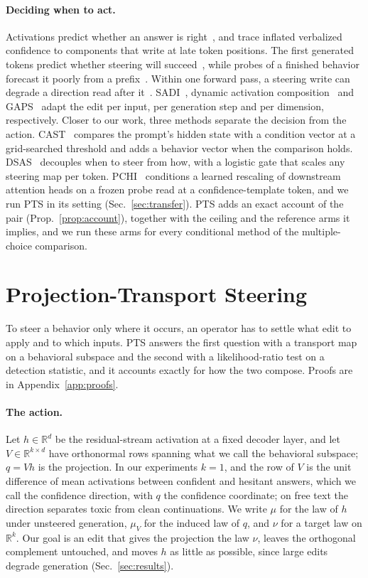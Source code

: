 \documentclass{article}
\begin{document}
\paragraph{Deciding when to act.} Activations predict whether an answer is
right~\citep{kadavath2022know,azaria2023lying}, and \citet{zhao2026wired} trace
inflated verbalized confidence to components that write at late token
positions. The first generated tokens predict whether steering will
succeed~\citep{steerable2026}, while probes of a finished behavior forecast it
poorly from a prefix~\citep{fpcg2026}. Within one forward pass, a steering
write can degrade a direction read after it~\citep{luo2026yopo}.
SADI~\citep{wang2025sadi}, dynamic activation
composition~\citep{scalena2024dynamic} and GAPS~\citep{gaps2026} adapt the edit
per input, per generation step and per dimension, respectively. Closer to our
work, three methods separate the decision from the action.
CAST~\citep{lee2024cast} compares the prompt's hidden state with a condition
vector at a grid-searched threshold and adds a behavior vector when the
comparison holds. DSAS~\citep{ferrando2026dsas} decouples when to steer from
how, with a logistic gate that scales any steering map per token.
PCHI~\citep{liu2026probe} conditions a learned rescaling of downstream
attention heads on a frozen probe read at a confidence-template token, and we
run PTS in its setting (Sec.~\ref{sec:transfer}). PTS adds an exact account of
the pair (Prop.~\ref{prop:account}), together with the ceiling and the
reference arms it implies, and we run these arms for every conditional method
of the multiple-choice comparison.

\section{Projection-Transport Steering}
\label{sec:method}

To steer a behavior only where it occurs, an operator has to settle what edit
to apply and to which inputs. PTS answers the first question with a transport
map on a behavioral subspace and the second with a likelihood-ratio test on a
detection statistic, and it accounts exactly for how the two compose. Proofs
are in Appendix~\ref{app:proofs}.

\paragraph{The action.} Let $h\in\mathbb{R}^d$ be the residual-stream activation
at a fixed decoder layer, and let $V\in\mathbb{R}^{k\times d}$ have orthonormal
rows spanning what we call the behavioral subspace; $q=Vh$ is the projection.
In our experiments $k=1$, and the row of $V$ is the unit difference of mean
activations between confident and hesitant answers, which we call the
confidence direction, with $q$ the confidence coordinate; on free text the
direction separates toxic from clean continuations. We write $\mu$ for the law
of $h$ under unsteered generation, $\mu_V$ for the induced law of $q$, and
$\nu$ for a target law on $\mathbb{R}^k$. Our goal is an edit that gives the
projection the law $\nu$, leaves the orthogonal complement untouched, and
moves $h$ as little as possible, since large edits degrade generation
(Sec.~\ref{sec:results}).
\end{document}
